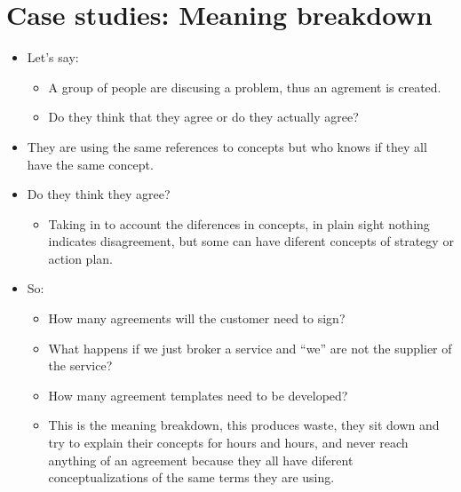 \section{Case studies: Meaning breakdown}
\begin{itemize}
    \item Let's say:
        \begin{itemize}
            \item A group of people are discusing a problem, thus an agrement is created.
            \item Do they think that they agree or do they actually agree? 
        \end{itemize}
    
    \item They are using the same references to concepts but who knows if they all have the same concept.
    \item Do they think they agree? 
        \begin{itemize}
            \item Taking in to account the diferences in concepts, in plain sight nothing indicates disagreement, but some can have diferent concepts of strategy or action plan.
        \end{itemize}
    \item So:
        \begin{itemize}
            \item How many agreements will the customer need to sign? 
            \item What happens if we just broker a service and ``we'' are not the supplier of the service? 
            \item How many agreement templates need to be developed? 
            \item This is the meaning breakdown, this produces waste, they sit down and try to explain their concepts for hours and hours, and never reach anything of an agreement because they all have diferent conceptualizations of the same terms they are using.
        \end{itemize}
\end{itemize}


